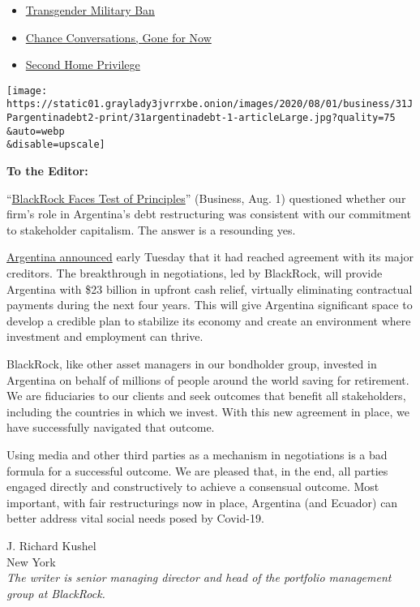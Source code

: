 \begin{itemize}
\tightlist
\item
  \protect\hyperlink{link-41dc3ccd}{Transgender Military Ban}
\item
  \protect\hyperlink{link-39030f85}{Chance Conversations, Gone for Now}
\item
  \protect\hyperlink{link-7febb0b}{Second Home Privilege}
\end{itemize}

\texttt{[image: https://static01.graylady3jvrrxbe.onion/images/2020/08/01/business/31JPargentinadebt2-print/31argentinadebt-1-articleLarge.jpg?quality=75\\\&auto=webp\\\&disable=upscale]}

\textbf{To the Editor:}

``\href{https://www.nytimes3xbfgragh.onion/2020/07/31/business/argentina-debt.html}{BlackRock
Faces Test of Principles}'' (Business, Aug. 1) questioned whether our
firm's role in Argentina's debt restructuring was consistent with our
commitment to stakeholder capitalism. The answer is a resounding yes.

\href{https://www.economia.gob.ar/en/argentina-and-three-creditor-groups-reach-a-deal-on-debt-restructuring/}{Argentina
announced} early Tuesday that it had reached agreement with its major
creditors. The breakthrough in negotiations, led by BlackRock, will
provide Argentina with \$23 billion in upfront cash relief, virtually
eliminating contractual payments during the next four years. This will
give Argentina significant space to develop a credible plan to stabilize
its economy and create an environment where investment and employment
can thrive.

BlackRock, like other asset managers in our bondholder group, invested
in Argentina on behalf of millions of people around the world saving for
retirement. We are fiduciaries to our clients and seek outcomes that
benefit all stakeholders, including the countries in which we invest.
With this new agreement in place, we have successfully navigated that
outcome.

Using media and other third parties as a mechanism in negotiations is a
bad formula for a successful outcome. We are pleased that, in the end,
all parties engaged directly and constructively to achieve a consensual
outcome. Most important, with fair restructurings now in place,
Argentina (and Ecuador) can better address vital social needs posed by
Covid-19.

J. Richard Kushel\\
New York\\
\emph{The writer is senior managing director and head of the portfolio
management group at BlackRock.}

